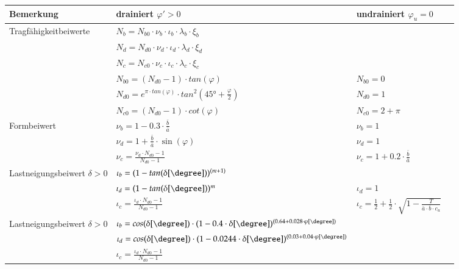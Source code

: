 \begin{minipage}{0.85\linewidth}
	\begin{tabular}{l|l|ll}
		Bemerkung	& drainiert $ \varphi ' > 0 $	& undrainiert $ \varphi_u = 0 $ & \\ \hline
		
		Tragfähigkeitbeiwerte	& $ N_b
									= N_{b0} \cdot \nu_b \cdot \iota_b \cdot \lambda_b \cdot \xi_b $											& &	\\
								& $ N_d
								= N_{d0} \cdot \nu_d \cdot \iota_d \cdot \lambda_d \cdot \xi_d $	& & \\
								& $ N_c
								= N_{c0} \cdot \nu_c \cdot \iota_c \cdot \lambda_c \cdot \xi_c $ & & \\ \hline
								& $ N_{b0}
								= ( N_{d0} - 1 ) \cdot tan (\varphi) $	& $ N_{b0} = 0 $ & \\
								& $ N_{d0}
								= e^{ \pi \cdot tan ( \varphi) } \cdot tan^2 ( 45° + \frac{\varphi}{2} ) $ & $ N_{d0} = 1 $ & \\
								& $ N_{c0}
								= ( N_{d0} - 1) \cdot cot (\varphi) $ & $ N_{c0} = 2 + \pi $ & \\ \hline
		Formbeiwert				& $ \nu_b
								= 1 - 0.3 \cdot \frac{\bar{b}}{\bar{a}} $	& $ \nu_b = 1 $ & \\
								& $ \nu_d
								= 1 + \frac{\bar{b}}{\bar{a}} \cdot \sin(\varphi) $ & $ \nu_d = 1 $ & \\
								& $ \nu_c = \frac{\nu_d \cdot N_{d0} -1}{N_{d0} -1} $ & $ \nu_c = 1 + 0.2 \cdot \frac{\bar{b}}{\bar{a}} $ & \\ \hline
		Lastneigungsbeiwert $ \delta > 0 $		& $ \iota_b = (1 - tan ( \delta [\degree] ) ) ^{(m+1)} $	& & \\
								& $ \iota_d = (1 - tan ( \delta [\degree] ) ) ^m $	& $ \iota_d = 1 $  & \\
								& $ \iota_c = \frac{\iota_d \cdot N_{d0} -1}{N_{d0} -1} $ & $ \iota_c = \frac{1}{2} + \frac{1}{2} \cdot \sqrt{1 - \frac{T}{\bar{a} \cdot \bar{b} \cdot c_u}} $ & 					%
								\\
		Lastneigungsbeiwert $ \delta > 0 $ 	& $ \iota_b = cos ( \delta [\degree] ) \cdot (1 - 0.4 \cdot \delta [\degree]) ^{(0.64 + 0.028 \cdot \varphi [\degree])} $ & & \\
								& $ \iota_d = cos (\delta [\degree]) \cdot (1 - 0.0244 \cdot \delta [\degree]) ^{(0.03 + 0.04 \cdot \varphi [\degree])} $ & & \\
								& $ \iota_c = \frac{\iota_d \cdot N_{d0} -1}{N_{d0} -1} $ & & \\

\end{tabular}
\end{minipage}
